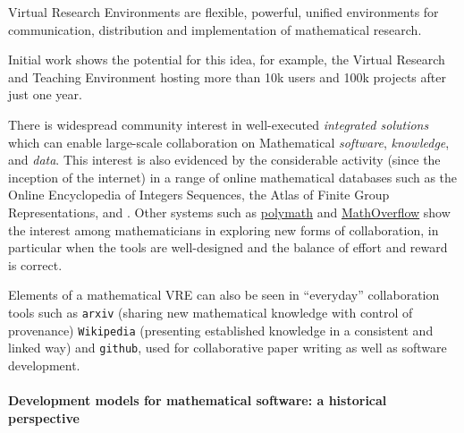 
Virtual Research Environments are flexible, powerful, unified
environments for communication, distribution and implementation of
mathematical research.

Initial work shows the potential for this idea, for example, the
Virtual Research and Teaching Environment \SMC hosting more than 10k
users and 100k projects after just one year.  

There is widespread community interest in well-executed
\emph{integrated solutions} which can enable large-scale collaboration
on Mathematical \emph{software}, \emph{knowledge}, and
\emph{data}. This interest is also evidenced by the considerable
activity (since the inception of the internet) in a range of online
mathematical databases such as the Online Encyclopedia of Integers
Sequences, the Atlas of Finite Group Representations, and \LMFDB.
%
Other systems such as \href{http://polymathprojects.org/}{polymath}
and \href{mathoverflow.net}{MathOverflow} show the interest among
mathematicians in exploring new forms of collaboration, in particular
when the tools are well-designed and the balance of effort and reward
is correct.

Elements of a mathematical VRE can also be seen in ``everyday''
collaboration tools such as \texttt{arxiv} (sharing new mathematical
knowledge with control of provenance) \texttt{Wikipedia} (presenting
established knowledge in a consistent and linked way) and
\texttt{github}, used for collaborative paper writing as
well as software development.



\paragraph{Development models for mathematical software: a historical
  perspective}

